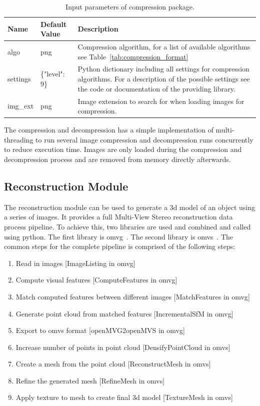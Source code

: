 \begin{table}[htb]
    \centering
    \caption{Input parameters of compression package.}
    \label{tab:compression_settings}
    \begin{tabular}{p{}|p{}|p{}}
        \textbf{Name} & \textbf{Default Value} & \textbf{Description} \\ \hline
        algo    & \gls{png}          & Compression algorithm, for a list of available algorithms see Table~\ref{tab:compression_format}\\
        settings    & \{"level": 9\} & Python dictionary including all settings for compression algorithms. For a description of the possible settings see the code or documentation of the providing library. \\
        img\_ext    & \gls{png}          & Image extension to search for when loading images for compression. 
    \end{tabular}
\end{table}

The compression and decompression has a simple implementation of multi-threading to run several image compression and decompression runs concurrently to reduce execution time. Images are only loaded during the compression and decompression process and are removed from memory directly afterwards.

\subsection{Reconstruction Module}
The reconstruction module can be used to generate a \gls{3d} model of an object using a series of images. It provides a full Multi-View Stereo reconstruction data process pipeline. To achieve this, two libraries are used and combined and called using python. The first library is \gls{omvg}~\cite{openMVG}. The second library is \gls{omvs}~\cite{openMVS}. 
The common steps for the complete pipeline is comprised of the following steps:
\begin{enumerate}
    \item Read in images [ImageListing in \gls{omvg}]
    \item Compute visual features [ComputeFeatures in \gls{omvg}]
    \item Match computed features between different images [MatchFeatures in \gls{omvg}]
    \item Generate point cloud from matched features [IncrementalSfM in \gls{omvg}]
    \item Export to \gls{omvs} format [openMVG2openMVS in \gls{omvg}]
    \item Increase number of points in point cloud [DensifyPointCloud in \gls{omvs}]
    \item Create a mesh from the point cloud [ReconstructMesh in \gls{omvs}]
    \item Refine the generated mesh [RefineMesh in \gls{omvs}]
    \item Apply texture to mesh to create final \gls{3d} model [TextureMesh in \gls{omvs}]
\end{enumerate}

